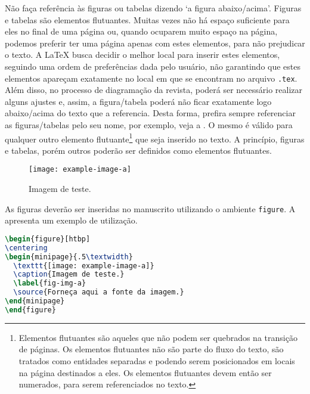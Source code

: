 \documentclass[portuguese]{textolivre}
\begin{document}
Não faça referência às figuras ou tabelas dizendo `a figura abaixo/acima'.
Figuras e tabelas são elementos flutuantes. Muitas vezes não há espaço suficiente para
eles no final de uma página ou, quando ocuparem muito espaço na página, podemos preferir
ter uma página apenas com estes elementos, para não prejudicar o texto.
A \LaTeX{} busca decidir o melhor local para inserir estes elementos, seguindo uma ordem
de preferências dada pelo usuário, não garantindo que estes elementos apareçam exatamente
no local em que se encontram no arquivo \verb|.tex|. Além disso, no processo de diagramação
da revista, poderá ser necessário realizar alguns ajustes e, assim, a figura/tabela poderá
não ficar exatamente logo abaixo/acima do texto que a referencia.
Desta forma, prefira sempre referenciar as figuras/tabelas pelo seu nome,
por exemplo, veja a . O mesmo é válido para qualquer outro elemento flutuante\footnote{
Elementos flutuantes são aqueles que não podem ser quebrados na transição de páginas.
Os elementos flutuantes não são parte do fluxo do texto, são tratados como entidades separadas
e podendo serem posicionados em locais na página destinados a eles. Os elementos flutuantes devem então
ser numerados, para serem referenciados no texto.
}
que seja inserido no texto. A princípio, figuras e tabelas, porém outros poderão ser definidos
como elementos flutuantes.

\begin{figure}[htbp]
\centering
\begin{minipage}{.5\textwidth}
 \texttt{[image: example-image-a]}
 \caption{Imagem de teste.}
 \label{fig-img-a}
\end{minipage}
\end{figure}

As figuras deverão ser inseridas no manuscrito utilizando o ambiente \verb|figure|.
A  apresenta um exemplo de utilização.
\begin{lstlisting}[language=tex, label=lst-figure, caption={Inserindo uma figura.}]
\begin{figure}[htbp]
\centering
\begin{minipage}{.5\textwidth} 
  \texttt{[image: example-image-a]} 
  \caption{Imagem de teste.} 
  \label{fig-img-a}
  \source{Forneça aqui a fonte da imagem.}
\end{minipage}
\end{figure}
\end{lstlisting} %
\end{document}

